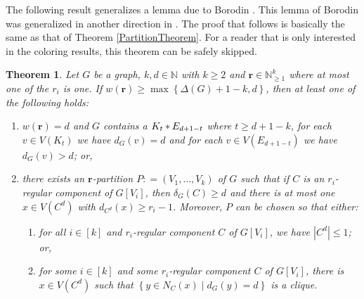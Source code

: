 \documentclass[12pt]{amsart}
\theoremstyle{plain}
\newtheorem{thm}{Theorem}[section]
\theoremstyle{definition}
\theoremstyle{remark}
\newcommand{\IN}{\mathbb{N}}
\newcommand{\set}[1]{\left\{ #1 \right\}}
\newcommand{\setb}[3]{\left\{ #1 \in #2 \mid #3 \right\}}
\newcommand{\card}[1]{\left|#1\right|}
\newcommand{\irange}[1]{\left[#1\right]}
\newcommand{\join}[2]{#1 \mbox{\hspace{2 pt}$\ast$\hspace{2 pt}} #2}
\newcommand{\parens}[1]{\left( #1 \right)}
\newcommand{\DefinedAs}{\mathrel{\mathop:}=}
\newcommand{\mov}[2]{#1^{#2}}
\newcommand{\wt}[1]{w\parens{#1}}
\renewcommand{\vec}[1]{\mathbf{#1}}
\begin{document}
The following result generalizes a lemma due to Borodin \cite{borodin1976decomposition}.  This lemma of Borodin was generalized in another direction in \cite{borodin2000variable}.  The proof that follows is basically the same as that of Theorem \ref{PartitionTheorem}.  For a reader that is only interested in the coloring results, this theorem can be safely skipped.

		\begin{thm}\label{DegenProp}
			Let $G$ be a graph, $k,d \in \IN$ with $k \geq 2$ and $\vec{r} \in \IN_{\geq 1}^k$ where at most one of the $r_i$ is one.  If $\wt{\vec{r}} \geq \max\set{\Delta(G) + 1 - k, d}$, then at least one of the following holds:
			\begin{enumerate}
			  \item $\wt{\vec{r}} = d$ and $G$ contains a $\join{K_t}{E_{d+1-t}}$ where $t \geq d +
			  1 - k$, for each $v \in V(K_t)$ we have $d_G(v) = d$ and for each $v \in
			  V(E_{d+1-t})$ we have $d_G(v) > d$; or,
			  \item there exists an $\vec{r}$-partition $P \DefinedAs \parens{V_1, \ldots, V_k}$ of 	
$G$ such that if $C$ is an $r_i$-regular component of $G[V_i]$, then $\delta_G(C) \geq d$ and
			  there is at most one $x \in V(\mov{C}{d})$ with $d_{\mov{C}{d}}(x) \geq
			  r_i -1$.  Moreover, $P$ can be chosen so that either: 
			  \begin{enumerate}
			    \item for all $i \in \irange{k}$ and $r_i$-regular component $C$ of
			    $G[V_i]$, we have $\card{\mov{C}{d}} \leq 1$; or,
			  	\item  for some $i \in \irange{k}$ and some $r_i$-regular component $C$ of
			  	$G[V_i]$, there is $x \in V(\mov{C}{d})$ such that
			  	$\setb{y}{N_C(x)}{d_G(y) = d}$ is a clique.
			  \end{enumerate}
			\end{enumerate}
		\end{thm}
\end{document}
